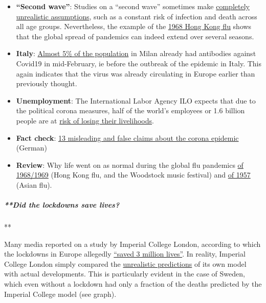 \begin{itemize}
{  positive results}, even with fairly accurate PCR tests, and the
  pandemic thus ``never seems to end''.
\item
  \textbf{``Second wave''}: Studies on a ``second wave'' sometimes make
  \href{https://www.heise.de/tp/features/Fellay-Studie-Zweite-Corona-Welle-4726303.html}{completely
  unrealistic assumptions}, such as a constant risk of infection and
  death across all age groups. Nevertheless, the example of the
  \href{https://www.britannica.com/event/Hong-Kong-flu-of-1968}{1968
  Hong Kong flu} shows that the global spread of pandemics can indeed
  extend over several seasons.
\item
  \textbf{Italy}:
  \href{https://www.medrxiv.org/content/10.1101/2020.05.11.20098442v2}{Almost
  5\% of the population} in Milan already had antibodies against Covid19
  in mid-February, ie before the outbreak of the epidemic in Italy. This
  again indicates that the virus was already circulating in Europe
  earlier than previously thought.
\item
  \textbf{Unemployment}: The International Labor Agency ILO expects that
  due to the political corona measures, half of the world's employees or
  1.6 billion people are at
  \href{https://www.theguardian.com/world/2020/apr/29/half-of-worlds-workers-at-immediate-risk-of-losing-livelihood-due-to-coronavirus}{risk
  of losing their livelihoods}.
\item
  \textbf{Fact check}:
  \href{https://www.infosperber.ch/Artikel/Gesundheit/13-irrefuhrende-und-falsche-Behauptungen-zur-Corona-Epidemie}{13
  misleading and false claims about the corona epidemic} (German)
\item
  \textbf{Review}: Why life went on as normal during the global flu
  pandemics
  \href{https://nypost.com/2020/05/16/why-life-went-on-as-normal-during-the-killer-pandemic-of-1969/}{of
  1968/1969} (Hong Kong flu, and the Woodstock music festival) and
  \href{http://www.ronpaulinstitute.org/archives/featured-articles/2020/may/06/the-great-pandemic-of-1957-and-why-nobody-remembers-it/}{of
  1957} (Asian flu).
\end{itemize}

\hypertarget{did-the-lockdowns-save-lives}{%
\subparagraph{**Did the lockdowns save
lives?}\label{did-the-lockdowns-save-lives}}

**

Many media reported on a study by Imperial College London, according to
which the lockdowns in Europe allegedly
\href{https://www.bbc.com/news/health-52968523}{``saved 3 million
lives''}. In reality, Imperial College London simply compared the
\href{https://www.telegraph.co.uk/technology/2020/05/16/neil-fergusons-imperial-model-could-devastating-software-mistake/}{unrealistic
predictions} of its own model with actual developments. This is
particularly evident in the case of Sweden, which even without a
lockdown had only a fraction of the deaths predicted by the Imperial
College model (see graph).

